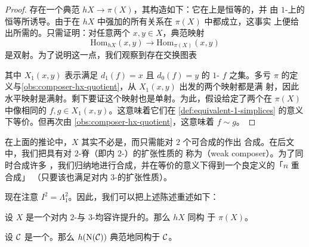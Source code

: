 \begin{proof}
存在一个典范\trFunctor{} $hX \to \pi(X)$，其构造如下：它在\trObject{}上是恒等的，并
由 $1$-\trSimplex{}上的恒等所诱导。由于在 $hX$ 中强加的所有关系在 $\pi(X)$ 中都成立，这事实
上便给出所需的\trFunctor{}。只需证明：对任意两个\trObject{} $x, y \in X$，典范映射
\[
\mathrm{Hom}_{hX}(x, y) \to \mathrm{Hom}_{\pi(X)}(x, y)
\]
是双射。为了说明这一点，我们观察到存在交换图表
\begin{center}
\end{center}
其中 $X_1(x, y)$ 表示满足 $d_1(f) = x$ 且 $d_0(f) = y$ 的 $1$-\trSimplex{} $f$ 之集。多亏
$\pi$ 的定义与\cref{obs:composer-hx-quotient}，从 $X_1(x, y)$ 出发的两个映射都是满
射，因此水平映射是满射。剩下要证这个映射也是单射。为此，假设给定了两个在 $\pi(X)$
中像相同的\trMorphism{} $f, g \in X_1(x, y)$。这意味着它们在%
\cref{def:equivalent-1-simplices} 的意义下等价。但再次由%
\cref{obs:composer-hx-quotient}，这意味着 $f \sim g$。
\end{proof}

\begin{remark}\label{rem:weak-composer}
在上面的推论中，$X$ 其实不必是\trComposer{}，而只需能对 $2$ 个可合成的\trMorphism{}作出
合成。在后文中，我们把具有对 $2$-脊（即内 $2$-\trHorn{}）的扩张性质的%
\trSimplicialSet{}称为\emph{\trWeakComposer{}}（weak composer）。为了同时合成许多%
\trMorphism{}，我们归纳地进行合成，并在等价的意义下得到一个良定义的「$n$ 重合成」
（只要该\trWeakComposer{}也满足对内 $3$-\trHorn{}的扩张性质）。
\end{remark}

现在注意 $I^2 = \Lambda^2_1$。因此，我们可以把上述陈述重述如下：

\begin{corollary}\label{cor:hx-iso-pi-x}
设 $X$ 是一个对内 $2$-与 $3$-\trHorn{}均容许提升的\trSimplicialSet{}。那么 $hX$ 同构
于 $\pi(X)$。
\end{corollary}

\begin{corollary}\label{cor:h-nerve-iso}
设 $\mathcal{C}$ 是一个\trCategory{}。那么 $h(\mathrm{N}(\mathcal{C}))$ 典范地同构于 $\mathcal{C}$。
\end{corollary}


